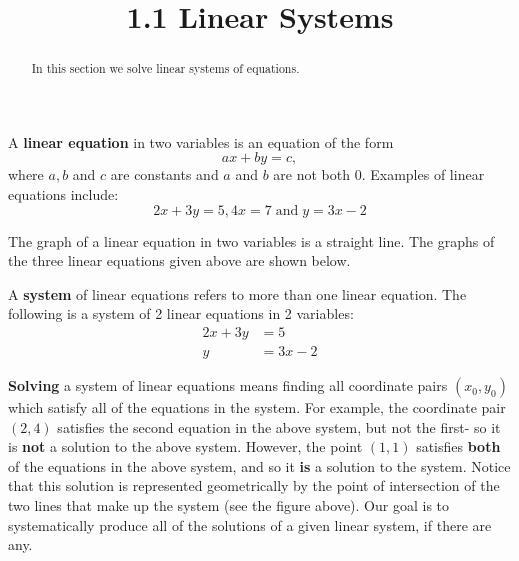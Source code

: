 \documentclass[handout]{ximera}
\title{1.1 Linear Systems}
\begin{document}
\begin{abstract}
In this section we solve linear systems of equations.
\end{abstract}
 
\maketitle

A {\bf linear equation} in two variables is an equation of the form 
\[
ax + by = c,
\]
where $a, b$ and $c$ are constants and $a$ and $b$ are not both $0$.
Examples of linear equations include:
\[
2x+3y =5, 4x = 7 \;\text{and}\; y = 3x -2
\]

The graph of a linear equation in two variables is a straight line. The graphs of the three linear equations given above are shown below.


\begin{image}
\end{image}



\begin{image}
\end{image}


A {\bf system} of linear equations refers to more than one linear equation.
The following is a system of 2 linear equations in 2 variables:
\begin{align}
2x+3y &= 5\\
y &= 3x-2
\end{align}

{\bf Solving} a system of linear equations means finding all coordinate pairs $(x_0, y_0)$ 
which satisfy all of the equations in the system. For example, the coordinate pair $(2,4)$ 
satisfies the second equation in the above system, but not the first- so it 
is {\bf not} a solution to the above system. However, the point $(1,1)$ 
satisfies {\bf both} of the equations in the above system, and so it {\bf is} a 
solution to the system.  Notice that this solution is represented geometrically by the 
point of intersection of the two lines that make up the system (see the figure above). 
Our goal is to systematically produce all of the solutions of a given linear system, if there are any.
\end{document}
